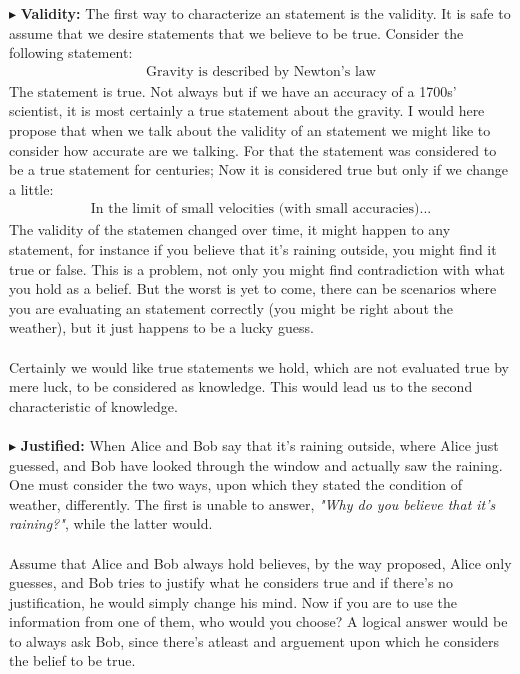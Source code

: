 \documentclass[9pt,a4paper,twocolumn]{article}
\newcommand{\newpoint}[1]{\indent$\blacktriangleright$ \textbf{#1}}
\begin{document}
                \newpoint{Validity:} The first way to characterize an statement is the validity. It is safe to assume that we desire statements that we believe to be true. Consider the following statement:
                \begin{align*}
                    \text{Gravity is described by Newton's law}
                \end{align*}
                The statement is true. Not always but if we have an accuracy of a 1700s' scientist, it is most certainly a true statement about the gravity. I would here propose that when we talk about the validity of an statement we might like to consider how accurate are we talking. For that the statement was considered to be a true statement for centuries; Now it is considered true but only if we change a little:
                \begin{align*}
                    \text{In the limit of small velocities (with small accuracies)...}
                \end{align*}
                The validity of the statemen changed over time, it might happen to any statement, for instance if you believe that it's raining outside, you might find it true or false. This is a problem, not only you might find contradiction with what you hold as a belief. But the worst is yet to come, there can be scenarios where you are evaluating an statement correctly (you might be right about the weather), but it just happens to be a lucky guess. 
                \\
                \\
                Certainly we would like true statements we hold, which are not evaluated true by mere luck, to be considered as knowledge. This would lead us to the second characteristic of knowledge.
                \\
                \\
                \newpoint{Justified:} When Alice and Bob say that it's raining outside, where Alice just guessed, and Bob have looked through the window and actually saw the raining. One must consider the two ways, upon which they stated the condition of weather, differently. The first is unable to answer, \textit{"Why do you believe that it's raining?"}, while the latter would.
                \\
                \\
                Assume that Alice and Bob always hold believes, by the way proposed, Alice only guesses, and Bob tries to justify what he considers true and if there's no justification, he would simply change his mind. Now if you are to use the information from one of them, who would you choose? A logical answer would be to always ask Bob, since there's atleast and arguement upon which he considers the belief to be true. 
\end{document}
